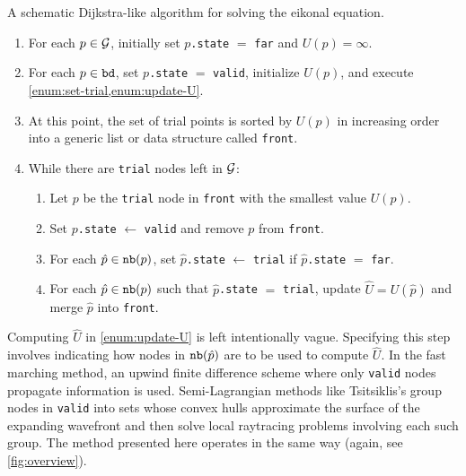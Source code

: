 \documentclass[eikonal.tex]{subfiles}
\begin{document}
\begin{algorithm}
  \caption{A schematic Dijkstra-like algorithm for solving the eikonal
    equation.}\label{alg:dijkstra-like}
  \begin{enumerate}[nolistsep]
  \item For each $p \in \mathcal{G}$, initially set $p$\texttt{.state} $=$
    \texttt{far} and $U(p) = \infty$.
  \item For each $p \in \texttt{bd}$, set $p$\texttt{.state} $=$
    \texttt{valid}, initialize $U(p)$, and execute
    \cref{enum:set-trial,enum:update-U}.
  \item At this point, the set of trial points is sorted by $U(p)$ in
    increasing order into a generic list or data structure called
    \texttt{front}.
  \item While there are \texttt{trial} nodes left in $\mathcal{G}$:
    \begin{enumerate}[nolistsep]
    \item Let $p$ be the \texttt{trial} node in \texttt{front} with
      the smallest value $U(p)$.
    \item Set $p$\texttt{.state} $\gets$ \texttt{valid} and remove $p$
      from \texttt{front}.
    \item For each $\hat{p} \in \texttt{nb}(p)$, set
      $\hat{p}$\texttt{.state} $\gets$ \texttt{trial} if
      $\hat{p}$\texttt{.state} $=$ \texttt{far}.\label{enum:set-trial}
    \item For each $\hat{p} \in \texttt{nb}(p)$ such that
      $\hat{p}$\texttt{.state} $=$ \texttt{trial}, update
      $\hat{U} = U(\hat{p})$ and merge $\hat{p}$ into
      \texttt{front}.\label{enum:update-U}
    \end{enumerate}
  \end{enumerate}
\end{algorithm}

Computing $\hat{U}$ in \cref{enum:update-U} is left intentionally
vague. Specifying this step involves indicating how nodes in
$\texttt{nb}(\hat{p})$ are to be used to compute $\hat{U}$. In the fast
marching method, an upwind finite difference scheme where only
\texttt{valid} nodes propagate information is used. Semi-Lagrangian
methods like Tsitsiklis's group nodes in \texttt{valid} into sets
whose convex hulls approximate the surface of the expanding wavefront
and then solve local raytracing problems involving each such
group. The method presented here operates in the same way (again, see
\cref{fig:overview}).
\end{document}
